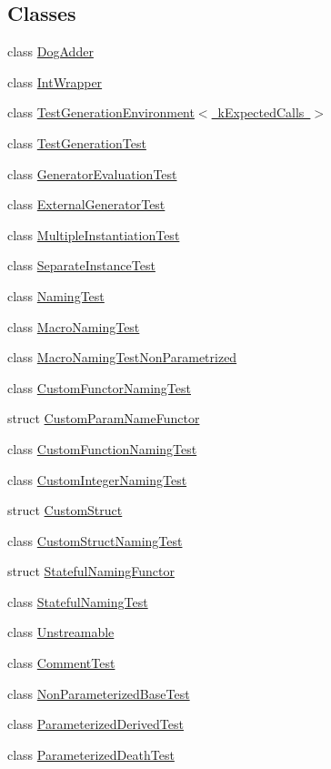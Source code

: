 \subsection*{Classes}
\begin{DoxyCompactItemize}
\item 
class \mbox{\hyperlink{class_dog_adder}{Dog\+Adder}}
\item 
class \mbox{\hyperlink{class_int_wrapper}{Int\+Wrapper}}
\item 
class \mbox{\hyperlink{class_test_generation_environment}{Test\+Generation\+Environment$<$ k\+Expected\+Calls $>$}}
\item 
class \mbox{\hyperlink{class_test_generation_test}{Test\+Generation\+Test}}
\item 
class \mbox{\hyperlink{class_generator_evaluation_test}{Generator\+Evaluation\+Test}}
\item 
class \mbox{\hyperlink{class_external_generator_test}{External\+Generator\+Test}}
\item 
class \mbox{\hyperlink{class_multiple_instantiation_test}{Multiple\+Instantiation\+Test}}
\item 
class \mbox{\hyperlink{class_separate_instance_test}{Separate\+Instance\+Test}}
\item 
class \mbox{\hyperlink{class_naming_test}{Naming\+Test}}
\item 
class \mbox{\hyperlink{class_macro_naming_test}{Macro\+Naming\+Test}}
\item 
class \mbox{\hyperlink{class_macro_naming_test_non_parametrized}{Macro\+Naming\+Test\+Non\+Parametrized}}
\item 
class \mbox{\hyperlink{class_custom_functor_naming_test}{Custom\+Functor\+Naming\+Test}}
\item 
struct \mbox{\hyperlink{struct_custom_param_name_functor}{Custom\+Param\+Name\+Functor}}
\item 
class \mbox{\hyperlink{class_custom_function_naming_test}{Custom\+Function\+Naming\+Test}}
\item 
class \mbox{\hyperlink{class_custom_integer_naming_test}{Custom\+Integer\+Naming\+Test}}
\item 
struct \mbox{\hyperlink{struct_custom_struct}{Custom\+Struct}}
\item 
class \mbox{\hyperlink{class_custom_struct_naming_test}{Custom\+Struct\+Naming\+Test}}
\item 
struct \mbox{\hyperlink{struct_stateful_naming_functor}{Stateful\+Naming\+Functor}}
\item 
class \mbox{\hyperlink{class_stateful_naming_test}{Stateful\+Naming\+Test}}
\item 
class \mbox{\hyperlink{class_unstreamable}{Unstreamable}}
\item 
class \mbox{\hyperlink{class_comment_test}{Comment\+Test}}
\item 
class \mbox{\hyperlink{class_non_parameterized_base_test}{Non\+Parameterized\+Base\+Test}}
\item 
class \mbox{\hyperlink{class_parameterized_derived_test}{Parameterized\+Derived\+Test}}
\item 
class \mbox{\hyperlink{class_parameterized_death_test}{Parameterized\+Death\+Test}}
\end{DoxyCompactItemize}
